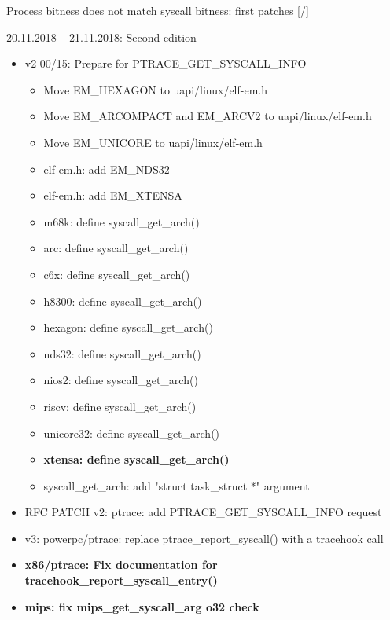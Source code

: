 \documentclass[unicode,aspectratio=169]{beamer}
\begin{document}
\begin{frame}{Process bitness does not match syscall bitness: first patches \hfill [\insertframenumber/\inserttotalframenumber]}
\begin{block}{20.11.2018 -- 21.11.2018: Second edition}
\begin{itemize}
	\item v2 00/15: Prepare for PTRACE\_GET\_SYSCALL\_INFO
	\begin{itemize}
		\tiny
		\item Move EM\_HEXAGON to uapi/linux/elf-em.h
		\item Move EM\_ARCOMPACT and EM\_ARCV2 to uapi/linux/elf-em.h
		\item Move EM\_UNICORE to uapi/linux/elf-em.h
		\item elf-em.h: add EM\_NDS32
		\item elf-em.h: add EM\_XTENSA
		\item m68k: define syscall\_get\_arch()
		\item arc: define syscall\_get\_arch()
		\item c6x: define syscall\_get\_arch()
		\item h8300: define syscall\_get\_arch()
		\item hexagon: define syscall\_get\_arch()
		\item nds32: define syscall\_get\_arch()
		\item nios2: define syscall\_get\_arch()
		\item riscv: define syscall\_get\_arch()
		\item unicore32: define syscall\_get\_arch()
		\item {\bf xtensa: define syscall\_get\_arch()}
		\item syscall\_get\_arch: add "struct task\_struct *" argument
	\end{itemize}
	\item RFC PATCH v2: ptrace: add PTRACE\_GET\_SYSCALL\_INFO request
	\item v3: powerpc/ptrace: replace ptrace\_report\_syscall() with a tracehook call
	\item {\bf x86/ptrace: Fix documentation for tracehook\_report\_syscall\_entry()}
	\item {\bf mips: fix mips\_get\_syscall\_arg o32 check}
\end{itemize}
\end{block}
\end{frame}
\end{document}
